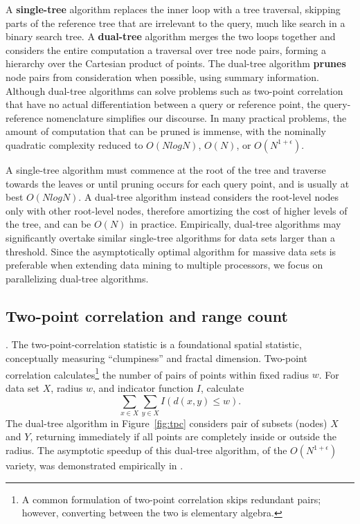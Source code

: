 \documentclass[twoside,leqno,twocolumn]{article}
\newcommand{\fig}[1]{Figure~\ref{fig:#1}}
\newcommand{\mysub}[1]{\subsection{#1}. }
\newcommand{\defterm}[1]{{\bf #1}}
\begin{document}
A \defterm{single-tree} algorithm replaces the inner loop with a tree traversal, skipping parts of the reference tree that are irrelevant to the query, much like search in a binary search tree.
A \defterm{dual-tree} algorithm merges the two loops together and considers the entire computation a traversal over tree node pairs, forming a hierarchy over the Cartesian product of points.
The dual-tree algorithm \defterm{prunes} node pairs from consideration when possible, using summary information.
Although dual-tree algorithms can solve problems such as two-point correlation that have no actual differentiation between a query or reference point, the query-reference nomenclature simplifies our discourse.
In many practical problems, the amount of computation that can be pruned is immense, with the nominally quadratic complexity reduced to $O(N log N)$, $O(N)$, or $O(N^{1+\epsilon})$.

A single-tree algorithm must commence at the root of the tree and traverse towards the leaves or until pruning occurs for each query point, and is usually at best $O(N log N)$.
A dual-tree algorithm instead considers the root-level nodes only with other root-level nodes, therefore amortizing the cost of higher levels of the tree, and can be $O(N)$ in practice.
Empirically, dual-tree algorithms may significantly overtake similar single-tree algorithms for data sets larger than a threshold.
Since the asymptotically optimal algorithm for massive data sets is preferable when extending data mining to multiple processors, we focus on parallelizing dual-tree algorithms.

\mysub{Two-point correlation and range count}
The two-point-correlation statistic is a foundational spatial statistic, conceptually measuring ``clumpiness'' and fractal dimension.
Two-point correlation calculates\footnote{A common formulation of two-point correlation skips redundant pairs; however, converting between the two is elementary algebra.} the number of pairs of points within fixed radius $w$.
For data set $X$, radius $w$, and indicator function $I$, calculate
\[\sum_{x \in X} \sum_{y \in X} I(d(x, y) \leq w).\]
\noindent
The dual-tree algorithm in \fig{tpc} considers pair of subsets (nodes) $X$ and $Y$, returning immediately if all points are completely inside or outside the radius.
The asymptotic speedup of this dual-tree algorithm, of the $O(N^{1+\epsilon})$ variety, was demonstrated empirically in \cite{gray_nbody}.
\end{document}
